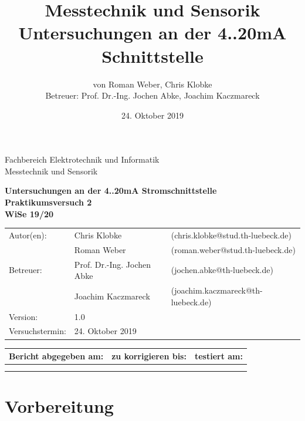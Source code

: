 \documentclass[a4paper,11pt,oneside]{article}
\author{von Roman Weber, Chris Klobke\\Betreuer: Prof. Dr.-Ing. Jochen Abke, Joachim Kaczmareck}
\title{Messtechnik und Sensorik\\Untersuchungen an der 4..20mA Schnittstelle}
\date{24. Oktober 2019}
\begin{document}
\pagestyle{empty}

Fachbereich Elektrotechnik und Informatik \\
Messtechnik und Sensorik


\begin{center}

\LARGE\textbf{Untersuchungen an der 4..20mA Stromschnittstelle} \\
\LARGE\textbf{Praktikumsversuch 2} \\
\LARGE\textbf{WiSe 19/20} \\

\vspace{2.0cm}

\end{center}

\vspace{5.0cm}

\begin{tabular}{lll}
  Autor(en): & Chris Klobke & (chris.klobke@stud.th-luebeck.de) \\
  			 & Roman Weber & (roman.weber@stud.th-luebeck.de) \\
  Betreuer: & Prof. Dr.-Ing. Jochen Abke & (jochen.abke@th-luebeck.de) \\
  			& Joachim Kaczmareck & (joachim.kaczmareck@th-luebeck.de) \\
  Version: & 1.0 & \\
  Versuchstermin: & 24. Oktober 2019 & \\
\end{tabular}

\vspace{1.0cm}


\vspace{2.0cm}
\begin{table}[h]
\centering
\begin{tabular}{|c|c|c|}
\hline
\textbf{Bericht abgegeben am:} & \textbf{zu korrigieren bis:} & \textbf{testiert am:} \\ \hline
\rule{0pt}{1.0cm}  &  & \multirow{2}{*}{} \\ \cline{1-2}
\rule{0pt}{1.0cm}  &  & \rule{4cm}{0cm} \\ \hline
\end{tabular}%
\end{table}
\newpage
\tableofcontents
\pagestyle{fancy}
\newpage
\section{Vorbereitung}
\end{document}
